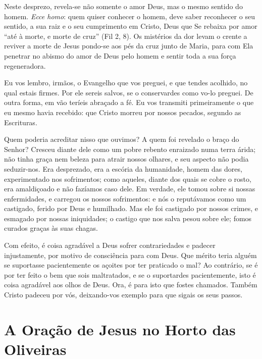 \documentclass{rosario}
\begin{document}
Neste desprezo, revela-se não somente o amor Deus, mas o mesmo sentido do homem.
\emph{Ecce homo}:
quem quiser conhecer o homem, deve saber reconhecer o seu sentido, a sua raiz e o seu cumprimento em Cristo, Deus que Se rebaixa por amor ``até à morte, e morte de cruz'' (Fil 2, 8).
Os mistérios da dor levam o crente a reviver a morte de Jesus pondo-se aos pés da cruz junto de Maria, para com Ela penetrar no abismo do amor de Deus pelo homem e sentir toda a sua força regeneradora.


Eu vos lembro, irmãos, o Evangelho que vos preguei, e que tendes acolhido, no qual estais firmes.
Por ele sereis salvos, se o conservardes como vo-lo preguei.
De outra forma, em vão teríeis abraçado a fé.
Eu vos transmiti primeiramente o que eu mesmo havia recebido:
que Cristo morreu por nossos pecados, segundo as Escrituras.


Quem poderia acreditar nisso que ouvimos?
A quem foi revelado o braço do Senhor?
Cresceu diante dele como um pobre rebento enraizado numa terra árida;
não tinha graça nem beleza para atrair nossos olhares, e seu aspecto não podia seduzir-nos.
Era desprezado, era a escória da humanidade, homem das dores, experimentado nos sofrimentos;
como aqueles, diante dos quais se cobre o rosto, era amaldiçoado e não fazíamos caso dele.
Em verdade, ele tomou sobre si nossas enfermidades, e carregou os nossos sofrimentos: e nós o reputávamos como um castigado, ferido por Deus e humilhado.
Mas ele foi castigado por nossos crimes, e esmagado por nossas iniquidades;
o castigo que nos salva pesou sobre ele;
fomos curados graças às suas chagas.


Com efeito, é coisa agradável a Deus sofrer contrariedades e padecer injustamente, por motivo de consciência para com Deus.
Que mérito teria alguém se suportasse pacientemente os açoites por ter praticado o mal?
Ao contrário, se é por ter feito o bem que sois maltratados, e se o suportardes pacientemente, isto é coisa agradável aos olhos de Deus.
Ora, é para isto que fostes chamados.
Também Cristo padeceu por vós, deixando-vos exemplo para que sigais os seus passos.


\section{A Oração de Jesus no Horto das Oliveiras}
\end{document}
